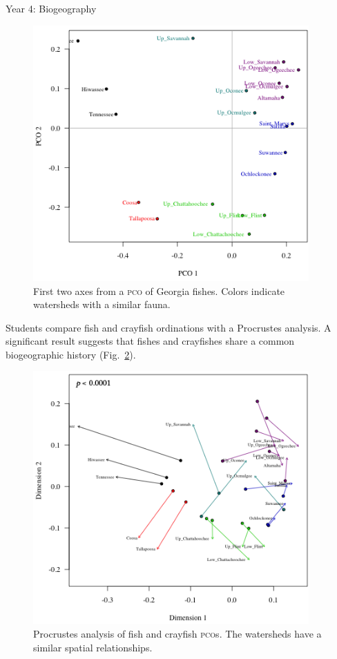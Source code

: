 \documentclass[final,hyperref={pdfpagelabels=false}]{beamer}
\newlength{\onecolwid}
\begin{document}
\begin{frame}[t]
\begin{columns}[t]
\begin{column}{\onecolwid}
\begin{block}{Year 4: Biogeography}
			\begin{figure}
				\includegraphics[width=0.94\textwidth]{fishes_pco}
				\caption{First two axes from a \textsc{pco} of Georgia fishes. Colors indicate watersheds with a similar fauna.\label{fig:pco}}
			\end{figure}
			
			Students compare fish and crayfish ordinations with a Procrustes analysis. A significant result suggests that fishes and crayfishes share a common biogeographic history (Fig.~\ref{fig:procrustes}). 
			
			\begin{figure}
				\includegraphics[width=0.94\textwidth]{procrustes}
				\caption{Procrustes analysis of fish and crayfish \textsc{pco}s. The watersheds have a  similar spatial relationships.\label{fig:procrustes}}
			\end{figure}
			

\end{block}
\end{column}
\end{columns}
\end{frame}
\end{document}
